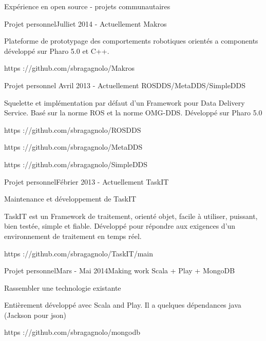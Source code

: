 \documentclass{resume} %
\begin{document}
\begin{rSection}{Exp\'{e}rience en open source - projets communautaires}


	\begin{rSubsection}{Projet personnel}{Julliet 2014 - Actuellement }{Makros}
		\item Plateforme de prototypage des comportements robotiques orient\'{e}s a components d\'{e}velopp\'{e} sur Pharo 5.0 et C++.
		\item https ://github.com/sbragagnolo/Makros		
	\end{rSubsection}
	\begin{rSubsection}{Projet personnel}{  Avril 2013 - Actuellement }{ROSDDS/MetaDDS/SimpleDDS}
		\item Squelette et impl\'{e}mentation par d\'{e}faut d'un Framework pour Data Delivery Service.  Bas\'{e} sur la norme ROS et la norme OMG-DDS. D\'{e}velopp\'{e} sur Pharo 5.0 
		\item https ://github.com/sbragagnolo/ROSDDS		
		\item https ://github.com/sbragagnolo/MetaDDS
		\item https ://github.com/sbragagnolo/SimpleDDS
	\end{rSubsection}
	\begin{rSubsection}{Projet personnel}{F\'{e}brier 2013 - Actuellement }{TaskIT}
		\item Maintenance et d\'{e}veloppement de TaskIT
		\item TaskIT est un Framework de traitement, orient\'{e} objet, facile \`{a} utiliser, puissant, bien test\'{e}e, simple et fiable. D\'{e}velopp\'{e} pour r\'{e}pondre aux exigences d'un environnement de traitement en temps r\'{e}el.
		\item  https ://github.com/sbragagnolo/TaskIT/main
	\end{rSubsection}

\begin{rSubsection}{Projet personnel}{Mars - Mai 2014}{Making work Scala + Play + MongoDB}
	\item Rassembler une technologie existante
	\item Enti\`{e}rement d\'{e}velopp\'{e} avec Scala and Play. Il a quelques d\'{e}pendances java (Jackson pour json)
	\item https ://github.com/sbragagnolo/mongodb
\end{rSubsection}


\end{rSection}
\end{document}
